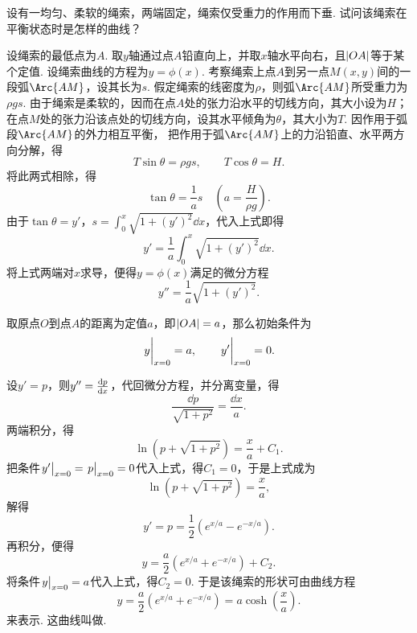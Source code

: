 \begin{example}
设有一均匀、柔软的绳索，两端固定，绳索仅受重力的作用而下垂.
试问该绳索在平衡状态时是怎样的曲线？
\begin{solution}
设绳索的最低点为\(A\).
取\(y\)轴通过点\(A\)铅直向上，并取\(x\)轴水平向右，且\(\abs{OA}\)等于某个定值.
设绳索曲线的方程为\(y = \phi(x)\).
考察绳索上点\(A\)到另一点\(M(x,y)\)间的一段弧\(\Arc{AM}\)，设其长为\(s\).
假定绳索的线密度为\(\rho\)，则弧\(\Arc{AM}\)所受重力为\(\rho gs\).
由于绳索是柔软的，因而在点\(A\)处的张力沿水平的切线方向，其大小设为\(H\)；
在点\(M\)处的张力沿该点处的切线方向，设其水平倾角为\(\theta\)，其大小为\(T\).
因作用于弧段\(\Arc{AM}\)的外力相互平衡，
把作用于弧\(\Arc{AM}\)上的力沿铅直、水平两方向分解，得\begin{equation*}
	T \sin\theta = \rho gs,
	\qquad
	T \cos\theta = H.
\end{equation*}
将此两式相除，得\begin{equation*}
	\tan\theta = \frac{1}{a} s
	\quad(a = \frac{H}{\rho g}).
\end{equation*}
由于\(\tan\theta = y'\)，\(s = \int_0^x \sqrt{1+(y')^2} \dd{x}\)，代入上式即得\begin{equation*}
	y' = \frac{1}{a} \int_0^x \sqrt{1+(y')^2} \dd{x}.
\end{equation*}
将上式两端对\(x\)求导，便得\(y = \phi(x)\)满足的微分方程\begin{equation*}
	y'' = \frac{1}{a} \sqrt{1+(y')^2}.
\end{equation*}

取原点\(O\)到点\(A\)的距离为定值\(a\)，即\(\abs{OA}=a\)，那么初始条件为\begin{equation*}
	\eval{y}_{x=0} = a, \qquad \eval{y'}_{x=0} = 0.
\end{equation*}

设\(y' = p\)，则\(y'' = \dv{p}{x}\)，代回微分方程，并分离变量，得\begin{equation*}
	\frac{\dd{p}}{\sqrt{1+p^2}} = \frac{\dd{x}}{a}.
\end{equation*}
两端积分，得\begin{equation*}
	\ln(p+\sqrt{1+p^2}) = \frac{x}{a} + C_1.
\end{equation*}
把条件\(\eval{y'}_{x=0} = \eval{p}_{x=0} = 0\)代入上式，得\(C_1 = 0\)，于是上式成为\begin{equation*}
	\ln(p+\sqrt{1+p^2}) = \frac{x}{a},
\end{equation*}
解得\begin{equation*}
	y' = p = \frac{1}{2} \left( e^{x/a} - e^{-x/a} \right).
\end{equation*}
再积分，便得\begin{equation*}
	y = \frac{a}{2} \left( e^{x/a} + e^{-x/a} \right) + C_2.
\end{equation*}
将条件\(\eval{y}_{x=0} = a\)代入上式，得\(C_2 = 0\).
于是该绳索的形状可由曲线方程
\begin{equation}\label{equation:微分方程.悬链线}
	y = \frac{a}{2} \left( e^{x/a} + e^{-x/a} \right)
	= a \cosh(\frac{x}{a}).
\end{equation}来表示.
这曲线叫做.
\end{solution}
\end{example}


